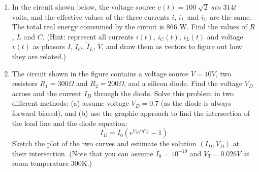\begin{enumerate}
\item 
In the circuit shown below, the voltage source $v(t)=100\;\sqrt{2}\;sin\;314t\;$ volts,
and the effective values of the three currents $i$, $i_L$ and $i_C$ are the same. The
total real energy comsumed by the circuit is 866 W. Find the values of $R$, $L$ and $C$.
(Hint: represent all currents $i(t)$, $i_C(t)$, $i_L(t)$ and voltage $v(t)$ as phasors 
$\dot{I}$, $\dot{I}_C$, $\dot{I}_L$, $\dot{V}$, and draw them as vectors to figure out
how they are related.)



%


\item The circuit shown in the figure contains a voltage source $V=10V$,
two resistors $R_1=300\Omega$ and $R_2=200\Omega$, and a silicon diode.
Find the voltage $V_D$ across and the current $I_D$ through the diode.
Solve this problem in two different methods: (a) assume voltage $V_D=0.7$ 
(as the diode is always forward biased), and (b) use the graphic approach
to find the intersection of the load line and the diode equation:
\[ I_D=I_0 ( e^{V_D/\eta V_T}-1 ) \]
Sketch the plot of the two curves and estimate the solution $(I_D,V_D)$
at their intersection. (Note that you can assume $I_0=10^{-10}$ and 
$V_T=0.026V$ at room temperature 300K.)


\end{enumerate}
